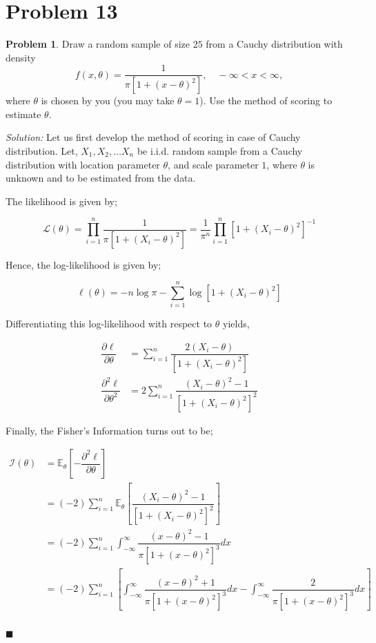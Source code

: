 \documentclass[12pt]{article}
\newcommand{\E}{\mathbb{E}}
\theoremstyle{definition}
\newtheorem*{prb}{Problem}
\newenvironment{problem}{\begin{tcolorbox}[colback=blue!5!white,colframe=blue!75!black, parbox = true] \begin{prb}  }{\end{prb}\end{tcolorbox} }
\newenvironment{answer}{\textit{Solution: }\quad }{ \hfill $\blacksquare$}
\numberwithin{equation}{section}
\begin{document}
\pagebreak
\section{Problem 13}

\begin{problem}
Draw a random sample of size $25$ from a Cauchy distribution with density
$$f(x,\theta) = \dfrac{1}{\pi \left[ 1+(x-\theta)^2 \right]}, \quad -\infty<x<\infty,$$
where $\theta$ is chosen by you (you may take $\theta = 1$). Use the method of scoring to estimate $\theta$.
\end{problem}

\begin{answer}
    Let us first develop the method of scoring in case of Cauchy distribution. Let, $X_1, X_2, \dots X_n$ be i.i.d. random sample from a Cauchy distribution with location parameter $\theta$, and scale parameter $1$, where $\theta$ is unknown and to be estimated from the data.

    The likelihood is given by;
    
    $$\mathcal{L}(\theta) = \prod_{i=1}^{n} \dfrac{1}{\pi\left[ 1 + (X_i-\theta)^2 \right]} = \dfrac{1}{\pi^n}\prod_{i=1}^{n} \left[1 + (X_i - \theta)^2 \right]^{-1}$$

    Hence, the log-likelihood is given by;

    $$\ell(\theta) = -n\log\pi - \sum_{i=1}^{n} \log\left[1 + (X_i - \theta)^2\right]$$

    Differentiating this log-likelihood with respect to $\theta$ yields,

    \begin{align*}
        \dfrac{\partial \ell}{\partial \theta}
        & = \sum_{i=1}^{n} \dfrac{2 (X_i - \theta)}{\left[1 + (X_i - \theta)^2\right]}\\
        \dfrac{\partial^2 \ell}{\partial \theta^2}
        & = 2\sum_{i=1}^{n} \dfrac{(X_i - \theta)^2 - 1}{\left[ 1 + (X_i - \theta)^2 \right]^2}
    \end{align*}

    Finally, the Fisher's Information turns out to be;

    \begin{align*}
        \mathcal{I}(\theta)
        & = \E_\theta\left[ - \dfrac{\partial^2 \ell}{\partial\theta}\right]\\
        & = (-2)\sum_{i = 1}^{n} \E_{\theta} \left[ \dfrac{(X_i - \theta)^2 - 1}{\left[ 1 + (X_i - \theta)^2 \right]^2} \right]\\
        & = (-2) \sum_{i = 1}^{n} \int_{-\infty}^{\infty} \dfrac{(x - \theta)^2 - 1}{\pi \left[ 1 + (x - \theta)^2 \right]^3} dx\\
        & = (-2) \sum_{i = 1}^{n} \left[ \int_{-\infty}^{\infty} \dfrac{(x - \theta)^2 + 1}{\pi \left[ 1 + (x - \theta)^2 \right]^3} dx - \int_{-\infty}^{\infty} \dfrac{2}{\pi \left[ 1 + (x - \theta)^2 \right]^3} dx  \right]\\
    \end{align*}


\end{answer}
\end{document}
